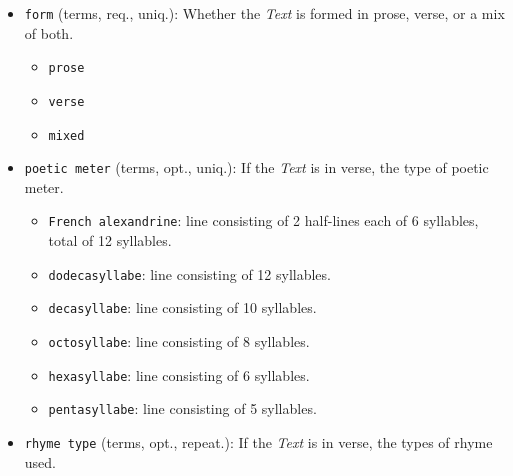 \begin{itemize}
\begin{multicols}{2}
\begin{itemize}
            \item \href{https://www.wikidata.org/wiki/Q2417210}{\texttt{non\_SWE}}: Old Swedish (800-1500)
            \item \texttt{oco}: Old Cornish
            \item \texttt{por}: Portugese
            \item \texttt{pro}: Old Occitan, Old Provençal (to 1500)
            \item \texttt{spa}: Spanish or Castilian
            \item \texttt{wlm}: Middle Welsh
            \item \href{https://data.biblissima.fr/w/Item:Q286307}{\texttt{xno}}: Anglo-French, Anglo-Norman
        \end{itemize}
    \end{multicols}
    \item \texttt{form} (terms, req., uniq.): Whether the \textit{Text} is formed in prose, verse, or a mix of both.
    \begin{multicols}{4}
        \begin{itemize}
            \item \texttt{prose}
            \item \texttt{verse}
            \item \texttt{mixed}
        \end{itemize}
    \end{multicols}
    \item \texttt{poetic meter} (terms, opt., uniq.): If the \textit{Text} is in verse, the type of poetic meter.
        \begin{itemize}
            \item \texttt{French alexandrine}: line consisting of 2 half-lines each of 6 syllables, total of 12 syllables.
            \item \texttt{dodecasyllabe}: line consisting of 12 syllables.
            \item \texttt{decasyllabe}: line consisting of 10 syllables.
            \item \texttt{octosyllabe}: line consisting of 8 syllables.
            \item \texttt{hexasyllabe}: line consisting of 6 syllables.
            \item \texttt{pentasyllabe}: line consisting of 5 syllables.
        \end{itemize}
    \item \texttt{rhyme type} (terms, opt., repeat.): If the \textit{Text} is in verse, the types of rhyme used.

\end{itemize}
